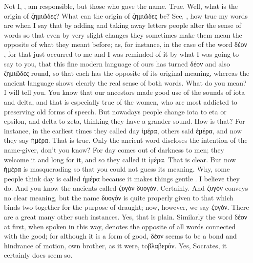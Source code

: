 {{{{{\socratesspeaks
Not I, \hermogenesspeaks, am responsible, but those who gave the name.
\hermogenesspeaks
True. Well, what is the origin of ζημιῶδες?
\socratesspeaks
What can the origin of ζημιῶδες be? See, \hermogenesspeaks, how true my words are when I say that by adding and taking away letters people alter the sense of words so that even by very slight changes they sometimes make them mean the opposite of what they meant before; as, for instance,  in the case of the word δέον , for that just occurred to me and I was reminded of it by what I was going to say to you, that this fine modern language of ours has turned δέον and also ζημιῶδες round, so that each has the opposite of its original meaning, whereas the ancient language shows clearly the real sense of both words.
\hermogenesspeaks
What do you mean?
\socratesspeaks
I will tell you. You know that our ancestors made good use of the sounds of iota and delta,  and that is especially true of the women, who are most addicted to preserving old forms of speech. But nowadays people change iota to eta or epsilon, and delta to zeta, thinking they have a grander sound.
\hermogenesspeaks
How is that?
\socratesspeaks
For instance, in the earliest times they called day ἱμέρα, others said ἑμέρα, and now they say ἡμέρα.
\hermogenesspeaks
That is true.
\socratesspeaks
Only the ancient word discloses the intention of the name-giver, don't you know? For day comes out of darkness to men; they welcome it and long  for it,  and so they called it ἱμέρα.
\hermogenesspeaks
That is clear.
\socratesspeaks
But now ἡμέρα is masquerading so that you could not guess its meaning. Why, some people think day is called ἡμέρα because it makes things gentle .
\hermogenesspeaks
I believe they do.
\socratesspeaks
And you know the ancients called ζυγόν  δυογόν.
\hermogenesspeaks
Certainly.
\socratesspeaks
And ζυγόν conveys no clear meaning,  but the name δυογόν is quite properly given to that which binds two together for the purpose of draught; now, however, we say ζυγόν. There are a great many other such instances.
\hermogenesspeaks
Yes, that is plain.
\socratesspeaks
Similarly the word δέον  at first, when spoken in this way, denotes the opposite of all words connected with the good; for although it is a form of good, δέον seems to be a bond  and hindrance of motion, own brother, as it were, toβλαβερόν.
\hermogenesspeaks
Yes, Socrates, it certainly does seem so.
\socratesspeaks
}}}}}
